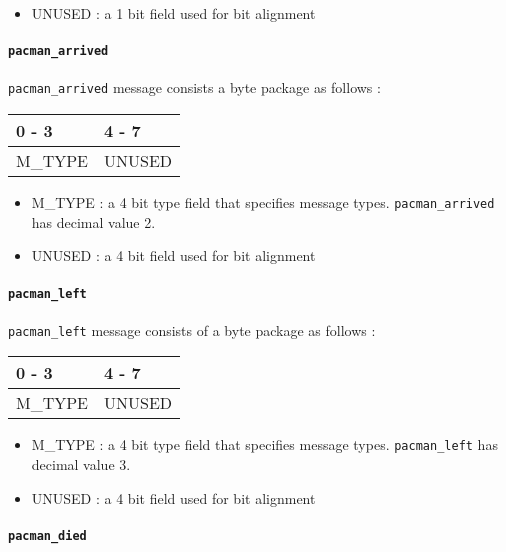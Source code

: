 \documentclass[]{article}
\providecommand{\tightlist}{%
  \setlength{\itemsep}{0pt}\setlength{\parskip}{0pt}}
\let\oldparagraph\paragraph
\renewcommand{\paragraph}[1]{\oldparagraph{#1}\mbox{}}
\begin{document}
\begin{itemize}
\tightlist
\item
  UNUSED : a 1 bit field used for bit alignment
\end{itemize}

\hypertarget{pacman_arrived}{%
\paragraph{\texorpdfstring{\texttt{pacman\_arrived}}{pacman\_arrived}}\label{pacman_arrived}}

\texttt{pacman\_arrived} message consists a byte package as follows :

\begin{longtable}[]{@{}ll@{}}
\toprule
0 - 3 & 4 - 7\tabularnewline
\midrule
\endhead
M\_TYPE & UNUSED\tabularnewline
\bottomrule
\end{longtable}

\begin{itemize}
\item
  M\_TYPE : a 4 bit type field that specifies message types.
  \texttt{pacman\_arrived} has decimal value 2.
\item
  UNUSED : a 4 bit field used for bit alignment
\end{itemize}

\hypertarget{pacman_left}{%
\paragraph{\texorpdfstring{\texttt{pacman\_left}}{pacman\_left}}\label{pacman_left}}

\texttt{pacman\_left} message consists of a byte package as follows :

\begin{longtable}[]{@{}ll@{}}
\toprule
0 - 3 & 4 - 7\tabularnewline
\midrule
\endhead
M\_TYPE & UNUSED\tabularnewline
\bottomrule
\end{longtable}

\begin{itemize}
\item
  M\_TYPE : a 4 bit type field that specifies message types.
  \texttt{pacman\_left} has decimal value 3.
\item
  UNUSED : a 4 bit field used for bit alignment
\end{itemize}

\hypertarget{pacman_died}{%
\paragraph{\texorpdfstring{\texttt{pacman\_died}}{pacman\_died}}\label{pacman_died}}
\end{document}
